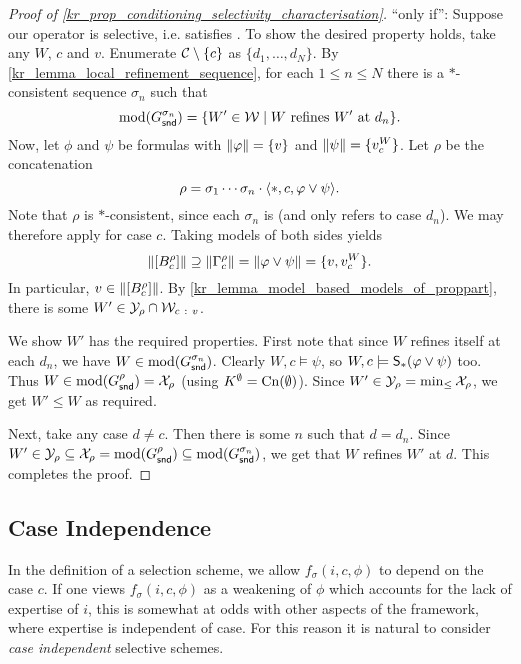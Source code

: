 \begin{proof}[Proof of \cref{kr_prop_conditioning_selectivity_characterisation}]
    ``only if'': Suppose our operator is selective, i.e. satisfies
    \boundedness{}. To show the desired property holds, take any $W$, $c$ and
    $v$. Enumerate $\C \setminus \{c\}$ as $\{d_1, \ldots, d_N\}$. By
    \cref{kr_lemma_local_refinement_sequence}, for each $1 \le n \le N$ there is a
    $\ast$-consistent sequence $\sigma_n$ such that
    \[
        \mods(G^{\sigma_n}_\snd)
        =
        \{W' \in \W \mid W \text{ refines } W' \text{ at } d_n\}.
    \]
    Now, let $\phi$ and $\psi$ be formulas with $\propmods{\phi} = \{v\}$ and
    $\propmods{\psi} = \{v^W_c\}$. Let $\rho$ be the concatenation
    \[
        \rho
        =
        \sigma_1 \cdots \sigma_n \concat
        \tuple{\ast, c, \phi \lor \psi}.
    \]
    Note that $\rho$ is $\ast$-consistent, since each $\sigma_n$ is (and only
    refers to case $d_n$). We may therefore apply \boundedness{} for case $c$.
    Taking models of both sides yields
    \[
        \propmods{\proppart{B^\rho_c}}
        \supseteq \propmods{\Gamma^\rho_c}
        = \propmods{\phi \lor \psi}
        = \{v, v^W_c\}.
    \]
    In particular, $v \in \propmods{\proppart{B^\rho_c}}$. By
    \cref{kr_lemma_model_based_models_of_proppart}, there is some $W' \in \Y_\rho
    \cap \W_{c\ :\ v}$.

    We show $W'$ has the required properties. First note that since $W$ refines
    itself at each $d_n$, we have $W \in \mods(G^{\sigma_n}_\snd)$. Clearly $W,
    c \models \psi$, so $W, c \models \S_\ast(\phi \lor \psi)$ too. Thus $W \in
    \mods(G^\rho_\snd) = \X_\rho$ (using $K^\emptyset = \cn(\emptyset)$). Since
    $W' \in \Y_\rho = \min_{\le}{\X_\rho}$, we get $W' \le W$ as required.

    Next, take any case $d \ne c$. Then there is some $n$ such that $d = d_n$.
    Since $W' \in \Y_\rho \subseteq \X_\rho = \mods(G^\rho_\snd) \subseteq
    \mods(G^{\sigma_n}_\snd)$, we get that $W$ refines $W'$ at $d$. This
    completes the proof.
\end{proof}

\subsection{Case Independence}

In the definition of a selection scheme, we allow $f_\sigma(i, c, \phi)$ to
depend on the case $c$. If one views $f_\sigma(i, c, \phi)$ as a weakening of
$\phi$ which accounts for the lack of expertise of $i$, this is somewhat at
odds with other aspects of the framework, where expertise is independent of
case. For this reason it is natural to consider \emph{case independent}
selective schemes.

